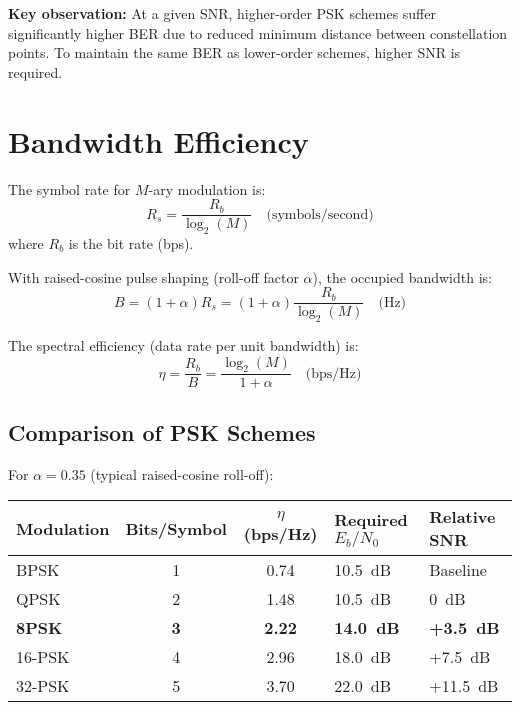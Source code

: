 \textbf{Key observation:} At a given SNR, higher-order PSK schemes suffer significantly higher BER due to reduced minimum distance between constellation points. To maintain the same BER as lower-order schemes, higher SNR is required.

\section{Bandwidth Efficiency}

The symbol rate for $M$-ary modulation is:
\begin{equation}
R_s = \frac{R_b}{\log_2(M)} \quad \text{(symbols/second)}
\end{equation}
where $R_b$ is the bit rate (bps).

With raised-cosine pulse shaping (roll-off factor $\alpha$), the occupied bandwidth is:
\begin{equation}
B = (1 + \alpha) R_s = (1 + \alpha) \frac{R_b}{\log_2(M)} \quad \text{(Hz)}
\end{equation}

The spectral efficiency (data rate per unit bandwidth) is:
\begin{equation}
\eta = \frac{R_b}{B} = \frac{\log_2(M)}{1 + \alpha} \quad \text{(bps/Hz)}
\end{equation}

\subsection{Comparison of PSK Schemes}

For $\alpha = 0.35$ (typical raised-cosine roll-off):

\begin{center}
\begin{tabularx}{\textwidth}{@{}lccXX@{}}
\toprule
Modulation & Bits/Symbol & $\eta$ (bps/Hz) & Required $E_b/N_0$ & Relative SNR \\
\midrule
BPSK & 1 & 0.74 & 10.5~dB & Baseline \\
QPSK & 2 & 1.48 & 10.5~dB & 0~dB \\
\textbf{8PSK} & \textbf{3} & \textbf{2.22} & \textbf{14.0~dB} & \textbf{+3.5~dB} \\
16-PSK & 4 & 2.96 & 18.0~dB & +7.5~dB \\
32-PSK & 5 & 3.70 & 22.0~dB & +11.5~dB \\
\bottomrule
\end{tabularx}
\end{center}

